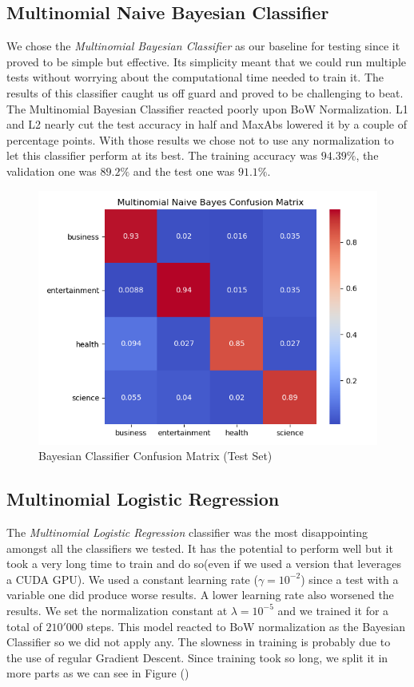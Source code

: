 \documentclass[10pt,a4paper]{report}
\begin{document}
\subsection{Multinomial Naive Bayesian Classifier}
We chose the \textit{Multinomial Bayesian Classifier} as our baseline for testing since it proved to be simple but effective. Its simplicity meant that we could run multiple tests without worrying about the computational time needed to train it. The results of this classifier caught us off guard and proved to be challenging to beat. The Multinomial Bayesian Classifier reacted poorly upon BoW Normalization. L1 and L2 nearly cut the test accuracy in half and MaxAbs lowered it by a couple of percentage points. With those results we chose not to use any normalization to let this classifier perform at its best. The training accuracy was $94.39 \%$, the validation one was $89.2 \%$ and the test one was $91.1 \%$.
\begin{figure}[!ht]
\centering
\includegraphics[width=0.5\linewidth]{bayes_confmat.png}
\caption{Bayesian Classifier Confusion Matrix (Test Set)}
\label{fig:bayes_confmat}
\end{figure}
\subsection{Multinomial Logistic Regression}
The \textit{Multinomial Logistic Regression} classifier was the most disappointing amongst all the classifiers we tested. It has the potential to perform well but it took a very long time to train and do so(even if we used a version that leverages a CUDA GPU). We used a constant learning rate ($\gamma=10^{-2}$) since a test with a variable one did produce worse results. A lower learning rate also worsened the results. We set the normalization constant at $\lambda=10^{-5}$ and we trained it for a total of $210'000$ steps. This model reacted to BoW normalization as the Bayesian Classifier so we did not apply any. The slowness in training is probably due to the use of regular Gradient Descent. Since training took so long, we split it in more parts as we can see in Figure () 
\end{document}
